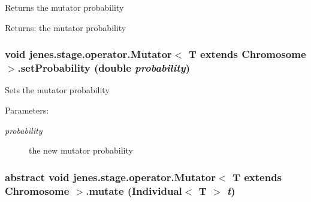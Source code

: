 Returns the mutator probability

\begin{Desc}
\item[Returns:]the mutator probability \end{Desc}
\hypertarget{classjenes_1_1stage_1_1operator_1_1_mutator_3_01_t_01extends_01_chromosome_01_4_49b8a34032a575badd2080d6c90397cb}{
\subsubsection[setProbability]{\setlength{\rightskip}{0pt plus 5cm}void jenes.stage.operator.Mutator$<$ T extends Chromosome $>$.setProbability (double {\em probability})}}
\label{classjenes_1_1stage_1_1operator_1_1_mutator_3_01_t_01extends_01_chromosome_01_4_49b8a34032a575badd2080d6c90397cb}


Sets the mutator probability

\begin{Desc}
\item[Parameters:]
\begin{description}
\item[{\em probability}]the new mutator probability \end{description}
\end{Desc}
\hypertarget{classjenes_1_1stage_1_1operator_1_1_mutator_3_01_t_01extends_01_chromosome_01_4_5ea1c6fd8d4ed580d70e1fafd85bb3a8}{
\subsubsection[mutate]{\setlength{\rightskip}{0pt plus 5cm}abstract void jenes.stage.operator.Mutator$<$ T extends Chromosome $>$.mutate (Individual$<$ T $>$ {\em t})}}
\label{classjenes_1_1stage_1_1operator_1_1_mutator_3_01_t_01extends_01_chromosome_01_4_5ea1c6fd8d4ed580d70e1fafd85bb3a8}


